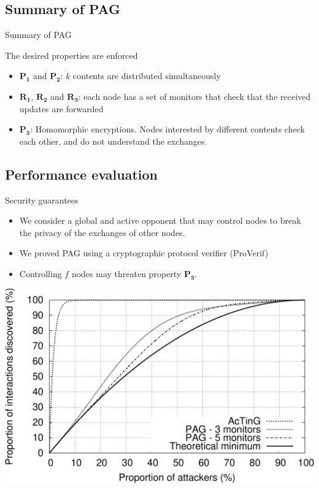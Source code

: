 \documentclass[10pt]{beamer}
\begin{document}
\subsection{Summary of PAG}
\begin{frame}{Summary of PAG}{}
\minipage[c][0.7\textheight][t]{\textwidth} 
  \begin{block}{The desired properties are enforced}
  \begin{itemize}
  \item $\mathbf{P_1}$ and $\mathbf{P_2}$: $k$ contents are distributed simultaneously
  \item $\mathbf{R_1}$, $\mathbf{R_2}$ and $\mathbf{R_3}$: each node has a set of monitors that check that the received updates are forwarded
  \item $\mathbf{P_3}$: Homomorphic encryptions. Nodes interested by different contents check each other, and do not understand the exchanges.
  \end{itemize}
  \end{block}
\endminipage
\end{frame}

\subsection{Performance evaluation}
\begin{frame}{Security guarantees}{}
   \begin{itemize}
      \item We consider a global and active opponent that may control nodes to break the privacy of the exchanges of other nodes.
      \item We proved PAG using a cryptographic protocol verifier (ProVerif)
      \item Controlling $f$ nodes may threaten property $\mathbf{P_3}$.
   \end{itemize} 
  
   \begin{center}
      \includegraphics[height=.55\textheight]{fig/PAG/probaPrivacy}
   \end{center}
\end{frame}
\end{document}

